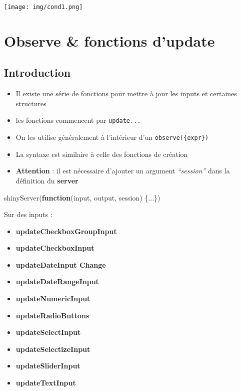 \documentclass[
]{article}
\newenvironment{Shaded}{\begin{snugshade}}{\end{snugshade}}
\newcommand{\ControlFlowTok}[1]{\textcolor[rgb]{0.13,0.29,0.53}{\textbf{#1}}}
\newcommand{\FunctionTok}[1]{\textcolor[rgb]{0.00,0.00,0.00}{#1}}
\newcommand{\NormalTok}[1]{#1}
\providecommand{\tightlist}{%
  \setlength{\itemsep}{0pt}\setlength{\parskip}{0pt}}
\begin{document}
\texttt{[image: img/cond1.png]}

\hypertarget{observe-fonctions-dupdate}{%
\section{Observe \& fonctions
d'update}\label{observe-fonctions-dupdate}}

\hypertarget{introduction-1}{%
\subsection{Introduction}\label{introduction-1}}

\begin{itemize}
\item
  Il existe une série de fonctions pour mettre à jour les inputs et
  certaines structures
\item
  les fonctions commencent par \texttt{update...}
\item
  On les utilise généralement à l'intérieur d'un
  \texttt{observe(\{expr\})}
\item
  La syntaxe est similaire à celle des fonctions de création
\item
  \textbf{Attention} : il est nécessaire d'ajouter un argument
  \emph{``session''} dans la définition du \textbf{server}
\end{itemize}

\begin{Shaded}
\begin{Highlighting}[]
\FunctionTok{shinyServer}\NormalTok{(}\ControlFlowTok{function}\NormalTok{(input, output, session) \{...\})}
\end{Highlighting}
\end{Shaded}

Sur des inputs :

\begin{itemize}
\tightlist
\item
  \textbf{updateCheckboxGroupInput}
\item
  \textbf{updateCheckboxInput}
\item
  \textbf{updateDateInput Change}
\item
  \textbf{updateDateRangeInput}
\item
  \textbf{updateNumericInput}
\item
  \textbf{updateRadioButtons}
\item
  \textbf{updateSelectInput}
\item
  \textbf{updateSelectizeInput}
\item
  \textbf{updateSliderInput}
\item
  \textbf{updateTextInput}
\end{itemize}
\end{document}
